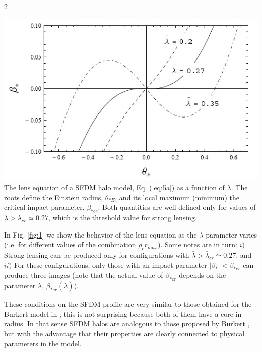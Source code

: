 \documentclass {article}
\begin{document}
\begin {multicols} {2}
\begin{minipage} {0.95\linewidth}
	\centering
	\includegraphics [width=0.95\linewidth] {fig_1}
	 {The lens equation of a SFDM halo model, Eq. (\ref{eq:5a}) as a function of $\bar{\lambda}$. The roots define the Einstein radius, $\theta_{*E}$, and its local maximum (minimum) the critical impact parameter, $\beta_{*cr}$. Both quantities are well defined only for values of $\bar{\lambda} > \bar{\lambda}_{cr} \simeq 0.27$, which is the threshold value for strong lensing.}
	\label {fig:1}
\end{minipage}


\bigskip
In Fig. \ref{fig:1} we show the behavior of the lens equation as the $\bar{\lambda}$ parameter varies (i.e. for different values of the combination $\rho_c r_{max}$). Some notes are in turn: $i)$ Strong lensing can be produced only for configurations with $\bar{\lambda} > \bar{\lambda}_{cr} \simeq 0.27$, and $ii)$ For these configurations, only those with an impact parameter $|\beta_*| < \beta_{*cr}$ can produce three images (note that the actual value of $ \beta_{*cr}$ depends on the parameter $\bar{\lambda}$, $ \beta_{*cr} (\bar{\lambda})$).


These conditions on the SFDM profile are very similar to those obtained for the Burkert model in \cite {Park_2003}; this is not surprising because both of them have a core in radius. In that sense SFDM halos are analogous to those proposed by Burkert \cite{Burkert_1995}, but with the advantage that their properties are clearly connected to physical parameters in the model.



\end{multicols}
\end{document}

